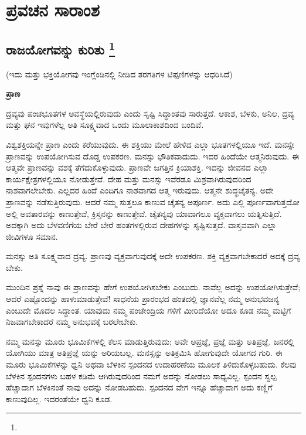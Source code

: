 

\part{ಪ್ರವಚನ ಸಾರಾಂಶ}

\chapter[ರಾಜಯೋಗವನ್ನು ಕುರಿತು ]{ರಾಜಯೋಗವನ್ನು ಕುರಿತು \protect\footnote{}}

\centerline{(ಇದು ಮತ್ತು ಭಕ್ತಿಯೋಗವು ಇಂಗ್ಲೆಂಡಿನಲ್ಲಿ ನೀಡಿದ ತರಗತಿಗಳ ಟಿಪ್ಪಣಿಗಳನ್ನು ಆಧರಿಸಿದೆ)}

\begin{center}
\textbf{ಪ್ರಾಣ}
\end{center}

ದ್ರವ್ಯವು ಪಂಚಭೂತಗಳ ಅವಸ್ಥೆಯಲ್ಲಿರುವುದು ಎಂದು ಸೃಷ್ಟಿ ಸಿದ್ಧಾಂತವು ಸಾರುತ್ತದೆ. ಆಕಾಶ, ಬೆಳಕು, ಅನಿಲ, ದ್ರವ್ಯ ಮತ್ತು ಘನ ಇವುಗಳೆಲ್ಲ ಅತಿ ಸೂಕ್ಷ್ಮವಾದ ಒಂದು ಮೂಲಾಕಾಶದಿಂದ ಬಂದಿವೆ.

ವಿಶ್ವಶಕ್ತಿಯನ್ನೇ ಪ್ರಾಣ ಎಂದು ಕರೆಯುವುದು. ಈ ಶಕ್ತಿಯು ಮೇಲೆ ಹೇಳಿದ ಎಲ್ಲಾ ಭೂತಗಳಲ್ಲಿಯೂ ಇದೆ. ಮನಸ್ಸೇ ಪ್ರಾಣವನ್ನು ಉಪಯೋಗಿಸುವ ದೊಡ್ಡ ಉಪಕರಣ. ಮನಸ್ಸು ಭೌತಿಕವಾದುದು. ಇದರ ಹಿಂದೆಯೇ ಆತ್ಮನಿರುವುದು. ಈ ಆತ್ಮವೇ ಪ್ರಾಣವನ್ನು ವಶಕ್ಕೆ ತೆಗೆದುಕೊಳ್ಳುವುದು. ಪ್ರಾಣವೇ ಜಗತ್ತಿನ ಕ್ರಿಯಾಶಕ್ತಿ. ಇದನ್ನು ಜೀವನದ ಎಲ್ಲಾ ಕಾರ್ಯಕ್ಷೇತ್ರಗಳಲ್ಲಿಯೂ ನೋಡುತ್ತೇವೆ. ದೇಹ ಮತ್ತು ಮನಸ್ಸು ಇವೆರಡೂ ಮಿಶ್ರವಾಗಿರುವುದರಿಂದ ನಾಶವಾಗಲೇಬೇಕು. ಎಲ್ಲದರ ಹಿಂದೆ ಎಂದಿಗೂ ನಾಶವಾಗದ ಆತ್ಮ ಇರುವುದು. ಆತ್ಮನೇ ಶುದ್ಧಚೈತನ್ಯ. ಅದೇ ಪ್ರಾಣವನ್ನು ನಡೆಸುತ್ತಿರುವುದು. ಆದರೆ ನಮ್ಮ ಸುತ್ತಲೂ ಕಾಣುವ ಚೈತನ್ಯ ಅಪೂರ್ಣ. ಅದು ಎಲ್ಲಿ ಪೂರ್ಣವಾಗುತ್ತದೋ ಅಲ್ಲಿ ಅವತಾರವನ್ನು ಕಾಣುತ್ತೇವೆ, ಕ್ರಿಸ್ತನನ್ನು ಕಾಣುತ್ತೇವೆ. ಚೈತನ್ಯವು ಯಾವಾಗಲೂ ವ್ಯಕ್ತವಾಗಲು ಯತ್ನಿಸುತ್ತಿದೆ. ಅದಕ್ಕಾಗಿ ಅದು ಬೆಳವಣಿಗೆಯ ಬೇರೆ ಬೇರೆ ಹಂತಗಳಲ್ಲಿರುವ ದೇಹಗಳನ್ನು ಸೃಷ್ಟಿಸುತ್ತದೆ. ವಾಸ್ತವವಾಗಿ ಎಲ್ಲಾ ಜೀವಿಗಳೂ ಸಮಾನ.

ಮನಸ್ಸು ಅತಿ ಸೂಕ್ಷ್ಮವಾದ ದ್ರವ್ಯ. ಪ್ರಾಣವು ವ್ಯಕ್ತವಾಗುವುದಕ್ಕೆ ಅದೇ ಉಪಕರಣ. ಶಕ್ತಿ ವ್ಯಕ್ತವಾಗಬೇಕಾದರೆ ಅದಕ್ಕೆ ದ್ರವ್ಯ ಬೇಕು.

ಮುಂದಿನ ಪ್ರಶ್ನೆ ನಾವು ಈ ಪ್ರಾಣವನ್ನು ಹೇಗೆ ಉಪಯೋಗಿಸಬೇಕು ಎಂಬುದು. ನಾವೆಲ್ಲ ಅದನ್ನು ಉಪಯೋಗಿಸುತ್ತೇವೆ; ಆದರೆ ಎಷ್ಟೊಂದನ್ನು ಹಾಳುಮಾಡುತ್ತೇವೆ! ಸಾಧನೆಯ ಪ್ರಾರಂಭದ ಹಂತದಲ್ಲಿ ಜ್ಞಾನವೆಲ್ಲ ನಮ್ಮ ಅನುಭವಜನ್ಯ ಎಂಬುದೇ ಮೊದಲ ಸಿದ್ಧಾಂತ. ಯಾವುದು ನಮ್ಮ ಪಂಚೇಂದ್ರಿಯ ಗಳಿಗೆ ಮೀರಿದೆಯೋ ಅದೂ ಕೂಡ ನಮ್ಮ ಮಟ್ಟಿಗೆ ನಿಜವಾಗಬೇಕಾದರೆ ನಮ್ಮ ಅನುಭವಕ್ಕೆ ಬರಲೇಬೇಕು.

ನಮ್ಮ ಮನಸ್ಸು ಮೂರು ಭೂಮಿಕೆಗಳಲ್ಲಿ ಕೆಲಸ ಮಾಡುತ್ತಿರುವುದು; ಅವೇ ಅಪ್ರಜ್ಞೆ, ಪ್ರಜ್ಞೆ ಮತ್ತು ಅತಿಪ್ರಜ್ಞೆ. ಜನರಲ್ಲಿ ಯೋಗಿಯು ಮಾತ್ರ ಅತಿಪ್ರಜ್ಞೆ ಯನ್ನು ಅರಿಯಬಲ್ಲ. ಮನಸ್ಸನ್ನು ಅತಿಕ್ರಮಿಸಿ ಹೋಗುವುದೇ ಯೋಗದ ಗುರಿ. ಈ ಮೂರು ಭೂಮಿಕೆಗಳನ್ನು ಧ್ವನಿ ಅಥವಾ ಬೆಳಕಿನ ಸ್ಪಂದನದ ಉದಾಹರಣೆಯ ಮೂಲಕ ತಿಳಿದುಕೊಳ್ಳಬಹುದು. ಕೆಲವು ಬೆಳಕಿನ ಸ್ಪಂದನಗಳು ಬಹಳ ಕಡಿಮೆ ಆಗಿರುವುದರಿಂದ ನಮಗೆ ಅದನ್ನು ನೋಡಲು ಸಾಧ್ಯವಿಲ್ಲ. ಸ್ಪಂದನ ಸ್ವಲ್ಪ ಹೆಚ್ಚಾದಾಗ ಬೆಳಕಿನಂತೆ ನಾವು ಅದನ್ನು ನೋಡಬಹುದು. ಸ್ಪಂದನದ ವೇಗ ಇನ್ನೂ ಹೆಚ್ಚಾದಾಗ ಅದು ಕಣ್ಣಿಗೆ ಕಾಣುವುದಿಲ್ಲ. ಇದರಂತೆಯೇ ಧ್ವನಿ ಕೂಡ.

